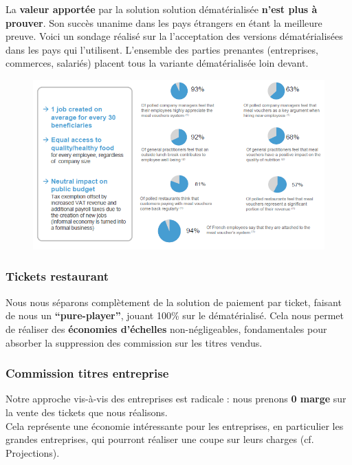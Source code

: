 La \textbf{valeur apportée} par la solution solution dématérialisée
\textbf{n’est plus à prouver}. Son succès unanime dans les pays étrangers en
étant la meilleure preuve. Voici un sondage réalisé sur la l’acceptation des
versions dématérialisées dans les pays qui l’utilisent. L’ensemble des parties
prenantes (entreprises, commerces, salariés) placent tous la variante
dématérialisée loin devant. \\

\begin{figure}[htpb]
    \centering
    \includegraphics[width=\textwidth]{image03}
\end{figure}

\subsubsection{Tickets restaurant}

Nous nous séparons complètement de la solution de paiement par ticket, faisant
de nous un \textbf{“pure-player”}, jouant 100\% sur le dématérialisé. Cela nous
permet de réaliser des \textbf{économies d’échelles} non-négligeables,
fondamentales pour absorber la suppression des commission sur les titres
vendus. \\

\subsubsection{Commission titres entreprise}

Notre approche vis-à-vis des entreprises est radicale : nous prenons \textbf{0
marge} sur la vente des tickets que nous réalisons. \\

Cela représente une économie intéressante pour les entreprises, en particulier
les grandes entreprises, qui pourront réaliser une coupe sur leurs charges (cf.
Projections). \\

